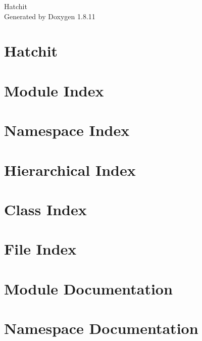 \documentclass[twoside]{book}
\newcommand{\+}{\discretionary{\mbox{\scriptsize$\hookleftarrow$}}{}{}}
\newcommand{\clearemptydoublepage}{%
  \newpage{\pagestyle{empty}\cleardoublepage}%
}
\begin{document}
\hypersetup{pageanchor=false,
             bookmarksnumbered=true,
             pdfencoding=unicode
            }
\begin{titlepage}
\vspace*{7cm}
\begin{center}%
{\Large Hatchit }\\
\vspace*{1cm}
{\large Generated by Doxygen 1.8.11}\\
\end{center}
\end{titlepage}
\clearemptydoublepage
\tableofcontents
\clearemptydoublepage
{}
\hypersetup{pageanchor=true}

\chapter{Hatchit}
\label{index}\hypertarget{index}{}
\chapter{Module Index}

\chapter{Namespace Index}

\chapter{Hierarchical Index}

\chapter{Class Index}

\chapter{File Index}

\chapter{Module Documentation}


\chapter{Namespace Documentation}





\end{document}
